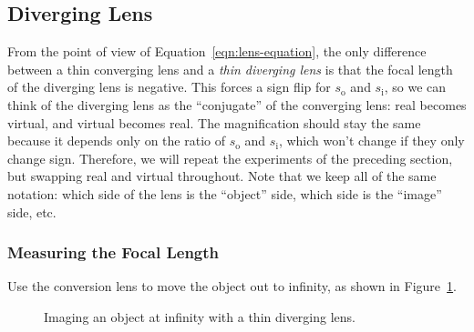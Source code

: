 \documentclass[]{manual}
\newcommand{\dlens}[4]{
    \pgfmathsetmacro{\lensRadius}{#2}
    \pgfmathsetmacro{\lensHeight}{#3}
    \pgfmathsetmacro{\lensWidth}{#4}
    \pgfmathsetmacro{\startAngle}{asin(\lensHeight/\lensRadius)}
    
    \draw[dashed] (#1, -\lensHeight*1.2) -- (#1, \lensHeight*1.2) node[above] {PP};
    
    \draw[ultra thick] (#1-\lensWidth,\lensHeight)
    arc[start angle=\startAngle,delta angle=-2*\startAngle,radius=\lensRadius]
    -- (#1+\lensWidth,-\lensHeight)
    arc[start angle=180+\startAngle,delta angle=-2*\startAngle,radius=\lensRadius]
    -- cycle;
}
\begin{document}
    \subsection{Diverging Lens}
    
    From the point of view of Equation~\eqref{eqn:lens-equation}, the only difference between a thin converging lens and a \emph{thin diverging lens} is that the focal length of the diverging lens is negative.
    This forces a sign flip for $s_{\mathrm{o}}$ and $s_{\mathrm{i}}$, so we can think of the diverging lens as the ``conjugate'' of the converging lens: real becomes virtual, and virtual becomes real.
    The magnification should stay the same because it depends only on the ratio of $s_{\mathrm{o}}$ and $s_{\mathrm{i}}$, which won't change if they only change sign.
    Therefore, we will repeat the experiments of the preceding section, but swapping real and virtual throughout.
    Note that we keep all of the same notation: which side of the lens is the ``object'' side, which side is the ``image'' side, etc.
    
    \subsubsection{Measuring the Focal Length}
    
    Use the conversion lens to move the object out to infinity, as shown in Figure~\ref{fig:object-at-infinity-diverging}.
    
        
    \begin{figure}[H]
        \centering
        
        
        \caption{
            Imaging an object at infinity with a thin diverging lens.
        }
        
        \label{fig:object-at-infinity-diverging}
    \end{figure}
\end{document}
